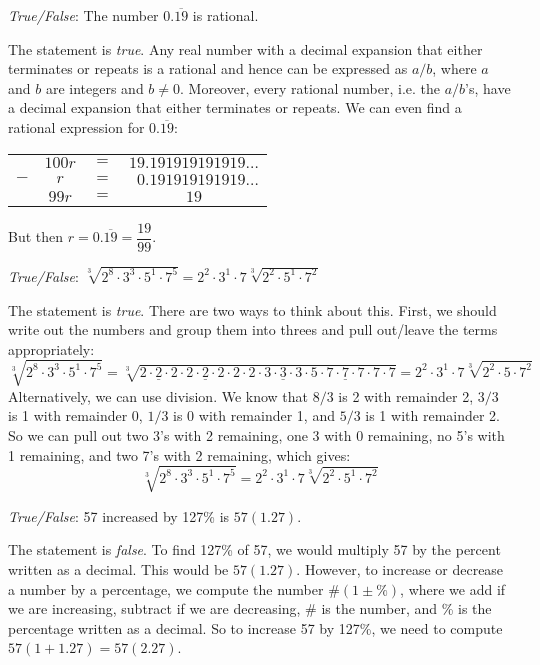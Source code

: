 \documentclass[11pt,letterpaper]{article}
\begin{document}
\quizsol \textit{True/False}: The number $0.\overline{19}$ is rational. \pspace

\sol The statement is \textit{true}. Any real number with a decimal expansion that either terminates or repeats is a rational and hence can be expressed as $a/b$, where $a$ and $b$ are integers and $b \neq 0$. Moreover, every rational number, i.e. the $a/b$'s, have a decimal expansion that either terminates or repeats. We can even find a rational expression for $0.\overline{19}$:
	\begin{table}[!ht]
	\centering
	\begin{tabular}{rccc}
	 & $100r$ & $=$ & $19.191919191919\ldots$ \\ 
	$-$& $r$ & $=$ & $\phantom{0}0.191919191919\ldots$ \\ \hline
	& $99r$ & $=$ & $19$ 
	\end{tabular}
	\end{table} \par
But then $r= 0.\overline{19}= \dfrac{19}{99}$. \pvspace{1.5cm}

 

\quizsol \textit{True/False}: $\sqrt[3]{2^8 \cdot 3^3 \cdot 5^1 \cdot 7^5}= 2^2 \cdot 3^1 \cdot 7 \sqrt[3]{2^2 \cdot 5^1 \cdot 7^2}$ \pspace

\sol The statement is \textit{true}. There are two ways to think about this. First, we should write out the numbers and group them into threes and pull out/leave the terms appropriately:
	\[
	\sqrt[3]{2^8 \cdot 3^3 \cdot 5^1 \cdot 7^5}= \sqrt[3]{\underline{2 \cdot 2 \cdot 2} \cdot \underline{2 \cdot 2 \cdot 2} \cdot 2 \cdot 2 \cdot \underline{3 \cdot 3 \cdot 3} \cdot 5 \cdot \underline{7 \cdot 7 \cdot 7} \cdot 7 \cdot 7}= 2^2 \cdot 3^1 \cdot 7 \sqrt[3]{2^2 \cdot 5 \cdot 7^2}
	\]
Alternatively, we can use division. We know that $8/3$ is 2 with remainder 2, $3/3$ is 1 with remainder 0, $1/3$ is 0 with remainder 1, and $5/3$ is 1 with remainder 2. So we can pull out two 3's with 2 remaining, one 3 with 0 remaining, no 5's with 1 remaining, and two 7's with 2 remaining, which gives:
	\[
	\sqrt[3]{2^8 \cdot 3^3 \cdot 5^1 \cdot 7^5}= 2^2 \cdot 3^1 \cdot 7 \sqrt[3]{2^2 \cdot 5^1 \cdot 7^2}
	\] \pvspace{1.5cm}



\quizsol \textit{True/False}: 57 increased by 127\% is $57(1.27)$. \pspace

\sol The statement is \textit{false}. To find 127\% of 57, we would multiply 57 by the percent written as a decimal. This would be $57(1.27)$. However, to increase or decrease a number by a percentage, we compute the number $\#(1 \pm \%)$, where we add if we are increasing, subtract if we are decreasing, $\#$ is the number, and \% is the percentage written as a decimal. So to increase 57 by 127\%, we need to compute $57(1 + 1.27)= 57(2.27)$. \pvspace{1.5cm}
\end{document}
